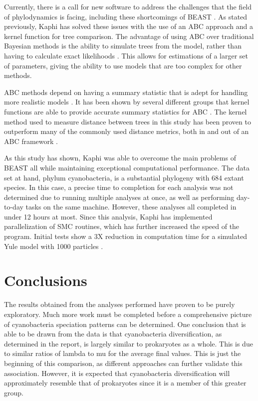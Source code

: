 \documentclass[12pt]{article}
\begin{document}
	Currently, there is a call for new software to address the challenges that the field of phylodynamics is facing, including these shortcomings of BEAST \cite{frost2015eight}. As stated previously, Kaphi has solved these issues with the use of an ABC approach and a kernel function for tree comparison. The advantage of using ABC over traditional Bayesian methods is the ability to simulate trees from the model, rather than having to calculate exact likelihoods \cite{sunnaaker2013approximate}. This allows for estimations of a larger set of parameters, giving the ability to use models that are too complex for other methods. 

	ABC methods depend on having a summary statistic that is adept for handling more realistic models \cite{park2016k2}. It has been shown by several different groups that kernel functions are able to provide accurate summary statistics for ABC \cite{mccloskey2016reconstructing}. The kernel method used to measure distance between trees in this study has been proven to outperform many of the commonly used distance metrics, both in and out of an ABC framework \cite{poon2015phylodynamic}.

	As this study has shown, Kaphi was able to overcome the main problems of BEAST all while maintaining exceptional computational performance. The data set at hand, phylum cyanobacteria, is a substantial phylogeny with 684 extant species. In this case, a precise time to completion for each analysis was not determined due to running multiple analyses at once, as well as performing day-to-day tasks on the same machine. However, these analyses all completed in under 12 hours at most. Since this analysis, Kaphi has implemented parallelization of SMC routines, which has further increased the speed of the program. Initial tests show a 3X reduction in computation time for a simulated Yule model with 1000 particles \cite{poon2017kaphi}. 


\section{ Conclusions}
	The results obtained from the analyses performed have proven to be purely exploratory. Much more work must be completed before a comprehensive picture of cyanobacteria speciation patterns can be determined. One conclusion that is able to be drawn from the data is that cyanobacteria diversification, as determined in the report, is largely similar to prokaryotes as a whole. This is due to similar ratios of lambda to mu for the average final values. This is just the beginning of this comparison, as different approaches can further validate this association. However, it is expected that cyanobacteria diversification will approximately resemble that of prokaryotes since it is a member of this greater group.
    
\end{document}
